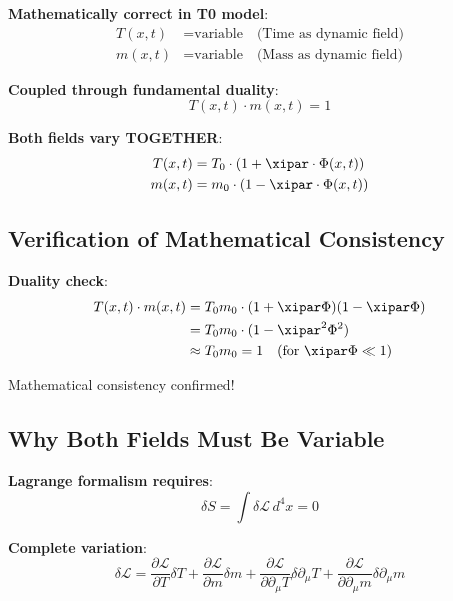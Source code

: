 	\textbf{Mathematically correct in T0 model}:
	\begin{align}
		T(x,t) &= \text{variable} \quad \text{(Time as dynamic field)} \\
		m(x,t) &= \text{variable} \quad \text{(Mass as dynamic field)}
	\end{align}
	
	\textbf{Coupled through fundamental duality}:
	\begin{equation}
		T(x,t) \cdot m(x,t) = 1
	\end{equation}
	
	\textbf{Both fields vary TOGETHER}:
	\begin{align}
		T(x,t) &= T_0 \cdot (1 + \xipar \cdot \Phi(x,t)) \\
		m(x,t) &= m_0 \cdot (1 - \xipar \cdot \Phi(x,t))
	\end{align}
	
	\subsection{Verification of Mathematical Consistency}
	
	\textbf{Duality check}:
	\begin{align}
		T(x,t) \cdot m(x,t) &= T_0 m_0 \cdot (1 + \xipar \Phi)(1 - \xipar \Phi) \\
		&= T_0 m_0 \cdot (1 - \xipar^2 \Phi^2) \\
		&\approx T_0 m_0 = 1 \quad \text{(for } \xipar \Phi \ll 1\text{)}
	\end{align}
	
	Mathematical consistency confirmed!
	
	\subsection{Why Both Fields Must Be Variable}
	
	\textbf{Lagrange formalism requires}:
	\begin{equation}
		\delta S = \int \delta \mathcal{L} \, d^4x = 0
	\end{equation}
	
	\textbf{Complete variation}:
	\begin{equation}
		\delta \mathcal{L} = \frac{\partial \mathcal{L}}{\partial T}\delta T + \frac{\partial \mathcal{L}}{\partial m}\delta m + \frac{\partial \mathcal{L}}{\partial \partial_\mu T}\delta \partial_\mu T + \frac{\partial \mathcal{L}}{\partial \partial_\mu m}\delta \partial_\mu m
	\end{equation}
	
